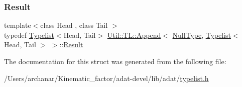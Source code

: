 \subsubsection{\texorpdfstring{Result}{Result}\hspace{0.1cm}{\footnotesize\ttfamily [3/3]}}
{\footnotesize\ttfamily template$<$class Head , class Tail $>$ \\
typedef \mbox{\hyperlink{structUtil_1_1Typelist}{Typelist}}$<$Head, Tail$>$ \mbox{\hyperlink{structUtil_1_1TL_1_1Append}{Util\+::\+T\+L\+::\+Append}}$<$ \mbox{\hyperlink{classUtil_1_1NullType}{Null\+Type}}, \mbox{\hyperlink{structUtil_1_1Typelist}{Typelist}}$<$ Head, Tail $>$ $>$\+::\mbox{\hyperlink{structUtil_1_1TL_1_1Append_3_01NullType_00_01Typelist_3_01Head_00_01Tail_01_4_01_4_aa4d82c7dd5a87a41fa2e1a0046427d13}{Result}}}



The documentation for this struct was generated from the following file\+:\begin{DoxyCompactItemize}
\item 
/\+Users/archanar/\+Kinematic\+\_\+factor/adat-\/devel/lib/adat/\mbox{\hyperlink{adat-devel_2lib_2adat_2typelist_8h}{typelist.\+h}}\end{DoxyCompactItemize}
